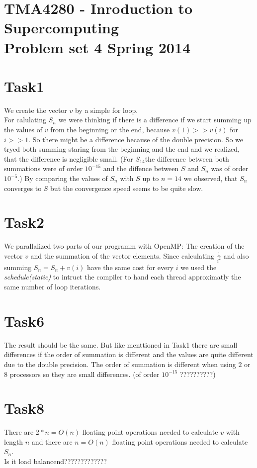 \documentclass[11pt,titlepage] {article}
\begin{document}
 
\section*{TMA4280 - Inroduction to Supercomputing\\ Problem set 4  Spring 2014}


\section{Task1}
We create the vector $v$ by a simple for loop. \\
For calulating $S_n$ we were thinking if there is a difference if we start summing up the values of $v$ from the beginning or the end, because $v(1)>>v(i)$ for $i>>1$. So there might be a difference because of the double precision. So we tryed both summing staring from the beginning and the end and we realized, that the difference is negligible small. (For $S_{14}$the difference between both summations were of order $10^{-15}$ and the diffence between $S$ and $S_n$ was of order $10^{-5}$.)
By comparing the values of $S_n$ with $S$ up to $n=14$ we observed, that $S_n$ converges to $S$ but the convergence speed seems to be quite slow. 

\section{Task2}
 We parallalized two parts of our programm with OpenMP: The creation of the vector $v$ and the summation of the vector elements. Since calculating $\frac{1}{i^2}$ and also summing $S_n=S_n+v(i)$ 
have the same cost for every $i$ we used the \textit{schedule(static)} to intruct the compiler to hand each thread approximatly the same number of loop iterations.


\section{Task6}
The result should be the same. But like menttioned in Task1 there are small differences if the order of summation is different and the values are quite different due to the double precision. The order of summation is different when using $2$ or $8$ processors so they are small differences. (of order  $10^{-15}$   ??????????)

\section{Task8}
There are $2*n=O(n)$ floating point operations needed to calculate $v$ with length $n$ and there are $n=O(n)$ floating point operations needed to calculate $S_n$.\\
Is it load balancend?????????????
\end{document}
